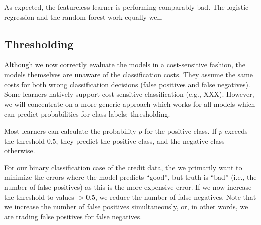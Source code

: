 \documentclass[
  11pt,
  parskip=half,
  DIV=calc,
  BCOR=10mm,
  x11names]{scrbook}
\begin{document}
As expected, the featureless learner is performing comparably bad.
The logistic regression and the random forest work equally well.

\hypertarget{thresholding}{%
\subsection{Thresholding}\label{thresholding}}

Although we now correctly evaluate the models in a cost-sensitive fashion, the models themselves are unaware of the classification costs.
They assume the same costs for both wrong classification decisions (false positives and false negatives).
Some learners natively support cost-sensitive classification (e.g., XXX).
However, we will concentrate on a more generic approach which works for all models which can predict probabilities for class labels: thresholding.

Most learners can calculate the probability \(p\) for the positive class.
If \(p\) exceeds the threshold \(0.5\), they predict the positive class, and the negative class otherwise.

For our binary classification case of the credit data, the we primarily want to minimize the errors where the model predicts ``good'', but truth is ``bad'' (i.e., the number of false positives) as this is the more expensive error.
If we now increase the threshold to values \(> 0.5\), we reduce the number of false negatives.
Note that we increase the number of false positives simultaneously, or, in other words, we are trading false positives for false negatives.
\end{document}
